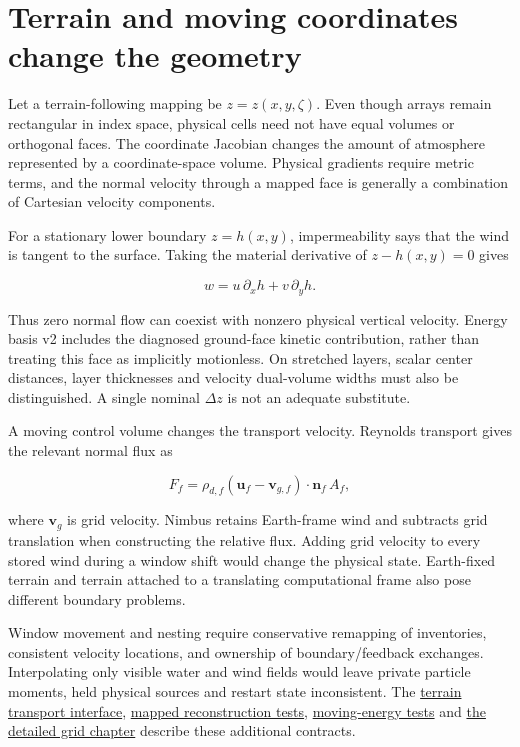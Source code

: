 \documentclass[
  11pt,
]{report}
\begin{document}
\section{Terrain and moving coordinates change the
geometry}\label{terrain-and-moving-coordinates-change-the-geometry}

Let a terrain-following mapping be \(z=z(x,y,\zeta)\). Even though
arrays remain rectangular in index space, physical cells need not have
equal volumes or orthogonal faces. The coordinate Jacobian changes the
amount of atmosphere represented by a coordinate-space volume. Physical
gradients require metric terms, and the normal velocity through a mapped
face is generally a combination of Cartesian velocity components.

For a stationary lower boundary \(z=h(x,y)\), impermeability says that
the wind is tangent to the surface. Taking the material derivative of
\(z-h(x,y)=0\) gives

\[w=u\,\partial_xh+v\,\partial_yh.\]

Thus zero normal flow can coexist with nonzero physical vertical
velocity. Energy basis v2 includes the diagnosed ground-face kinetic
contribution, rather than treating this face as implicitly motionless.
On stretched layers, scalar center distances, layer thicknesses and
velocity dual-volume widths must also be distinguished. A single nominal
\(\Delta z\) is not an adequate substitute.

A moving control volume changes the transport velocity. Reynolds
transport gives the relevant normal flux as

\[F_f=\rho_{d,f}
     (\boldsymbol u_f-\boldsymbol v_{g,f})\!\cdot\boldsymbol n_f\,A_f,\]

where \(\boldsymbol v_g\) is grid velocity. Nimbus retains Earth-frame
wind and subtracts grid translation when constructing the relative flux.
Adding grid velocity to every stored wind during a window shift would
change the physical state. Earth-fixed terrain and terrain attached to a
translating computational frame also pose different boundary problems.

Window movement and nesting require conservative remapping of
inventories, consistent velocity locations, and ownership of
boundary/feedback exchanges. Interpolating only visible water and wind
fields would leave private particle moments, held physical sources and
restart state inconsistent. The
\href{../include/terrain/conservative_transport.hpp}{terrain transport
interface},
\href{../tests/dynamics/test_mapped_reconstruction.cpp}{mapped
reconstruction tests},
\href{../tests/dynamics/test_native_moving_energy.cpp}{moving-energy
tests} and \hyperref[grid-deep-dive]{the detailed grid chapter} describe these additional
contracts.
\end{document}
